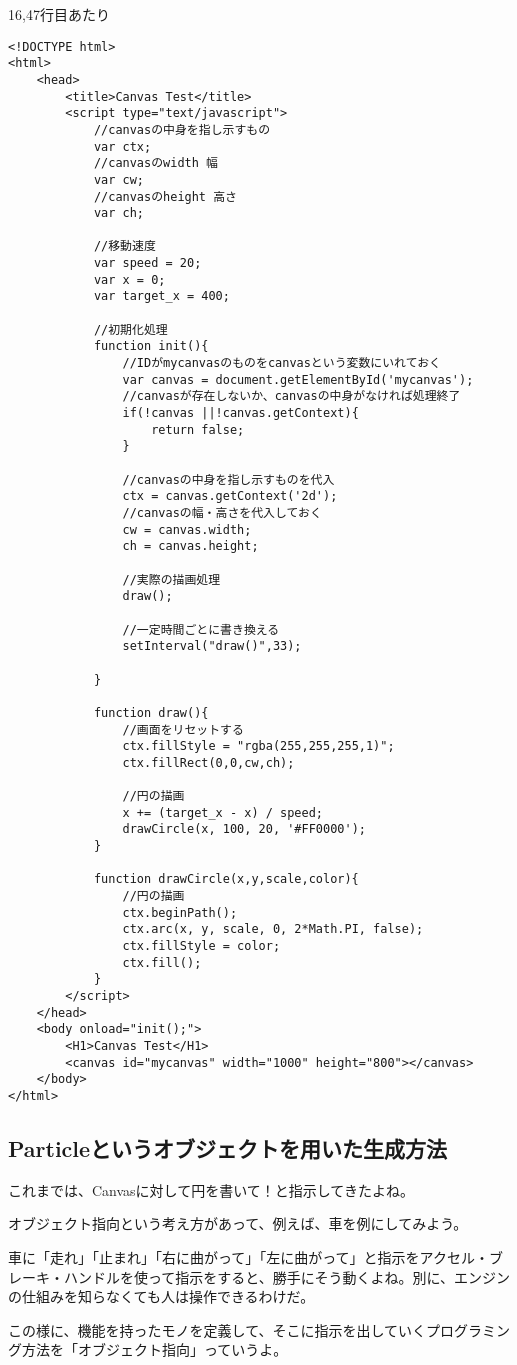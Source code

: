 \documentclass[mingoth,11pt,a4j,uplatex]{jsarticle}
\begin{document}
16,47行目あたり
\begin{lstlisting}[caption=摩擦のシミュレーション]
<!DOCTYPE html>
<html>
	<head>
		<title>Canvas Test</title>
		<script type="text/javascript">
			//canvasの中身を指し示すもの
			var ctx;
			//canvasのwidth 幅
			var cw;
			//canvasのheight 高さ
			var ch;
			
			//移動速度
			var speed = 20;
			var x = 0;
			var target_x = 400;
			
			//初期化処理
			function init(){
				//IDがmycanvasのものをcanvasという変数にいれておく
				var canvas = document.getElementById('mycanvas');
				//canvasが存在しないか、canvasの中身がなければ処理終了
				if(!canvas ||!canvas.getContext){
					return false;
				}
				
				//canvasの中身を指し示すものを代入
				ctx = canvas.getContext('2d');
				//canvasの幅・高さを代入しておく
				cw = canvas.width;
				ch = canvas.height;
				
				//実際の描画処理
				draw();
				
				//一定時間ごとに書き換える
				setInterval("draw()",33);

			}
			
			function draw(){
				//画面をリセットする
				ctx.fillStyle = "rgba(255,255,255,1)";
				ctx.fillRect(0,0,cw,ch);
				
				//円の描画
				x += (target_x - x) / speed;
				drawCircle(x, 100, 20, '#FF0000');
			}
			
			function drawCircle(x,y,scale,color){
				//円の描画
				ctx.beginPath();
				ctx.arc(x, y, scale, 0, 2*Math.PI, false);
				ctx.fillStyle = color;
				ctx.fill();
			}
		</script>
	</head>
	<body onload="init();">
		<H1>Canvas Test</H1>
		<canvas id="mycanvas" width="1000" height="800"></canvas>
	</body>
</html>
\end{lstlisting}

\subsection{Particleというオブジェクトを用いた生成方法}
これまでは、Canvasに対して円を書いて！と指示してきたよね。

オブジェクト指向という考え方があって、例えば、車を例にしてみよう。

車に「走れ」「止まれ」「右に曲がって」「左に曲がって」と指示をアクセル・ブレーキ・ハンドルを使って指示をすると、勝手にそう動くよね。別に、エンジンの仕組みを知らなくても人は操作できるわけだ。

この様に、機能を持ったモノを定義して、そこに指示を出していくプログラミング方法を「オブジェクト指向」っていうよ。
\end{document}
